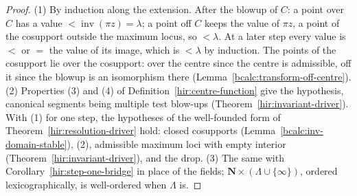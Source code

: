 \begin{proof}
\mixedleanok
(1) By induction along the extension. After the blowup of \(C\): a point over \(C\) has a value \(<\operatorname{inv}(\pi z)=\lambda\); a point off \(C\) keeps the value of
\(\pi z\), a point of the cosupport outside the maximum locus, so \(<\lambda\). At a later step every value is \(<\) or \(=\) the value of its image, which is \(<\lambda\) by
induction. The points of the cosupport lie over the cosupport: over the centre since the centre is admissible, off it since the blowup is an isomorphism there
(Lemma~\ref{bcalc:transform-off-centre}).
(2) Properties (3) and (4) of Definition~\ref{hir:centre-function} give the hypothesis, canonical segments being multiple test blow-ups
(Theorem~\ref{hir:invariant-driver}). With (1) for one step, the hypotheses of the well-founded form of Theorem~\ref{hir:resolution-driver} hold: closed cosupports
(Lemma~\ref{bcalc:inv-domain-stable}), (2), admissible maximum loci with empty interior (Theorem~\ref{hir:invariant-driver}), and the drop.
(3) The same with Corollary~\ref{hir:step-one-bridge} in place of the fields; \(\mathbf N\times(\Lambda\cup\{\infty\})\), ordered lexicographically, is well-ordered
when \(\Lambda\) is.
\end{proof}

